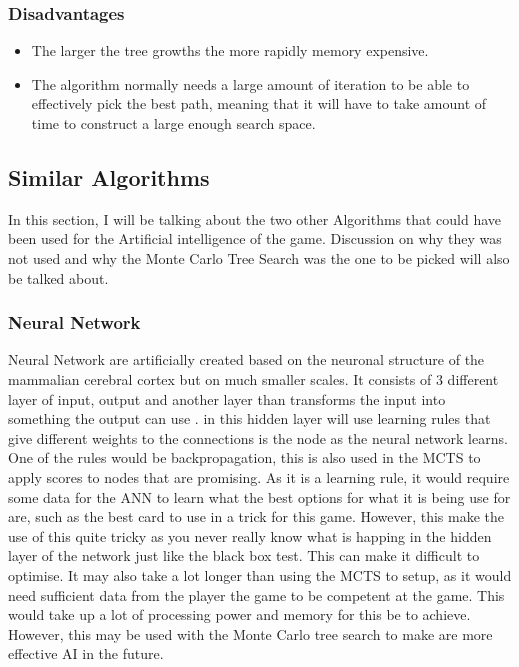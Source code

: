 \subsubsection{Disadvantages}
\begin{itemize}
\item The larger the tree growths the more rapidly memory expensive.
\item The algorithm normally needs a large amount of iteration to be able to effectively pick the best path, meaning that it will have to take amount of time to construct a large enough search space.
\end{itemize}

\subsection{Similar Algorithms}
In this section, I will be talking about the two other Algorithms that could have been used for the Artificial intelligence of the game. Discussion on why they was not used and why the Monte Carlo Tree Search was the one to be picked will also be talked about.
\subsubsection{Neural Network}
Neural Network are artificially created based on the neuronal structure of the mammalian cerebral cortex but on much smaller scales.\cite{NeuralNetwork} It consists of 3 different layer of input, output and another layer than transforms the input into something the output can use \cite{neural}. in this hidden layer will use learning rules that give different weights to the connections is the node as the neural network learns. One of the rules would be backpropagation, this is also used in the MCTS to apply scores to nodes that are promising. As it is a learning rule, it would require some data for the ANN to learn what the best options for what it is being use for are, such as the best card to use in a trick for this game. However, this make the use of this quite tricky as you never really know what is happing in the hidden layer of the network just like the black box test. This can make it difficult to optimise. It may also take a lot longer than using the MCTS to setup, as it would need sufficient data from the player the game to be competent at the game. This would take up a lot of processing power and memory for this be to achieve. However, this may be used with the Monte Carlo tree search to make are more effective AI in the future.
